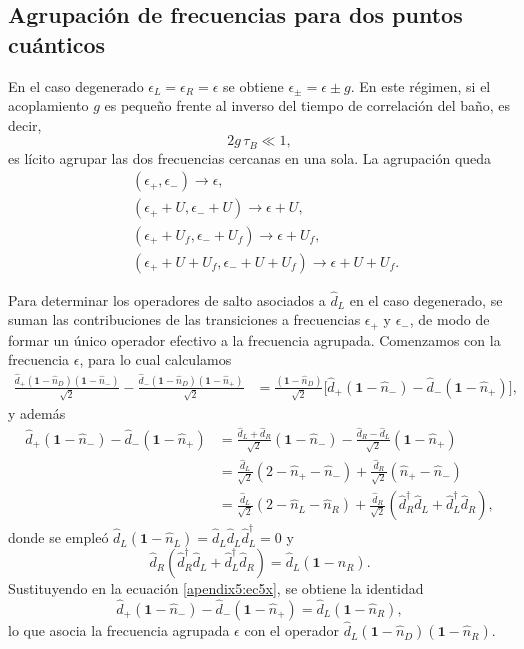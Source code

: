 \begin{appendixs}
\subsection{Agrupación de frecuencias para dos puntos cuánticos}
\label{apendix5frecuencygroup}

En el caso degenerado \(\epsilon_{L}=\epsilon_{R}=\epsilon\) se obtiene \(\epsilon_{\pm}=\epsilon\pm g\). En este régimen, si el acoplamiento \(g\) es pequeño frente al inverso del tiempo de correlación del baño, es decir,
\[
2g\,\tau_{B}\ll 1,
\]
es lícito agrupar las dos frecuencias cercanas en una sola. La agrupación queda
\begin{align*}
&(\epsilon_{+},\epsilon_{-}) \to \epsilon,\\
&(\epsilon_{+}+U,\epsilon_{-}+U) \to \epsilon+U,\\
&(\epsilon_{+}+U_{f},\epsilon_{-}+U_{f}) \to \epsilon+U_{f},\\
&(\epsilon_{+}+U+U_{f},\epsilon_{-}+U+U_{f}) \to \epsilon+U+U_{f}.
\end{align*}

Para determinar los operadores de salto asociados a \(\hat{d}_{L}\) en el caso degenerado, se suman las contribuciones de las transiciones a frecuencias \(\epsilon_{+}\) y \(\epsilon_{-}\), de modo de formar un único operador efectivo a la frecuencia agrupada. Comenzamos con la frecuencia \(\epsilon\), para lo cual calculamos
\begin{align*}
\frac{\hat{d}_{+}(\mathbf{1}-\hat{n}_{D})(\mathbf{1}-\hat{n}_{-})}{\sqrt{2}}
-\frac{\hat{d}_{-}(\mathbf{1}-\hat{n}_{D})(\mathbf{1}-\hat{n}_{+})}{\sqrt{2}}
&=\frac{(\mathbf{1}-\hat{n}_{D})}{\sqrt{2}}\Big[\hat{d}_{+}(\mathbf{1}-\hat{n}_{-})
- \hat{d}_{-}(\mathbf{1}-\hat{n}_{+})\Big],
\end{align*}
y además
\begin{align}
\hat{d}_{+}(\mathbf{1}-\hat{n}_{-})-\hat{d}_{-}(\mathbf{1}-\hat{n}_{+})
&=\frac{\hat{d}_{L}+\hat{d}_{R}}{\sqrt{2}}(\mathbf{1}-\hat{n}_{-})
-\frac{\hat{d}_{R}-\hat{d}_{L}}{\sqrt{2}}(\mathbf{1}-\hat{n}_{+})\nonumber\\
&=\frac{\hat{d}_{L}}{\sqrt{2}}(2-\hat{n}_{+}-\hat{n}_{-})
+\frac{\hat{d}_{R}}{\sqrt{2}}(\hat{n}_{+}-\hat{n}_{-})\nonumber\\
&=\frac{\hat{d}_{L}}{\sqrt{2}}(2-\hat{n}_{L}-\hat{n}_{R})
+\frac{\hat{d}_{R}}{\sqrt{2}}(\hat{d}^{\dagger}_{R}\hat{d}_{L}+\hat{d}^{\dagger}_{L}\hat{d}_{R}),
\label{apendix5:ec5x}
\end{align}
donde se empleó \(\hat{d}_{L}(\mathbf{1}-\hat{n}_{L})=\hat{d}_{L}\hat{d}_{L}\hat{d}^{\dagger}_{L}=0\) y
\[
\hat{d}_{R}(\hat{d}^{\dagger}_{R}\hat{d}_{L}+\hat{d}^{\dagger}_{L}\hat{d}_{R})
=\hat{d}_{L}(\mathbf{1}-\hat{n}_{R}).
\]
Sustituyendo en la ecuación \eqref{apendix5:ec5x}, se obtiene la identidad
\[
\hat{d}_{+}(\mathbf{1}-\hat{n}_{-})-\hat{d}_{-}(\mathbf{1}-\hat{n}_{+})
=\hat{d}_{L}(\mathbf{1}-\hat{n}_{R}),
\]
lo que asocia la frecuencia agrupada \(\epsilon\) con el operador
\(\hat{d}_{L}(\mathbf{1}-\hat{n}_{D})(\mathbf{1}-\hat{n}_{R})\).
\\


\end{appendixs}
